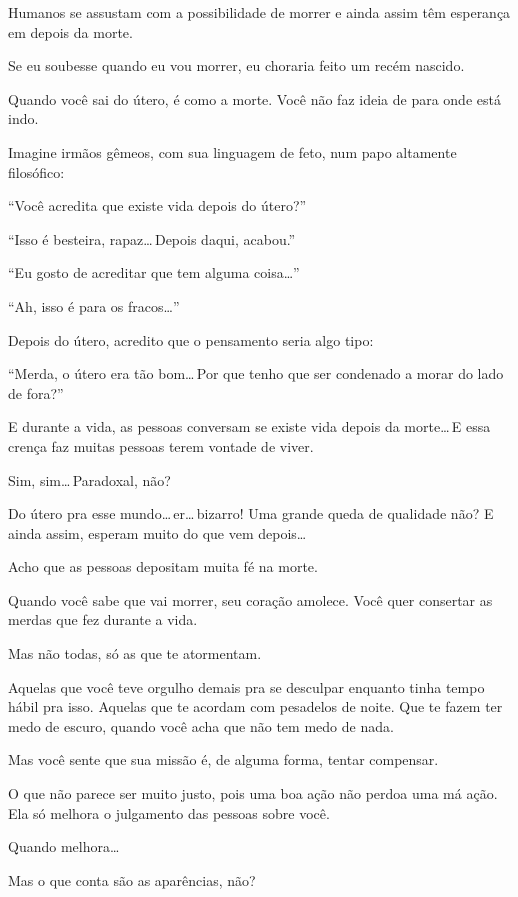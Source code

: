 Humanos se assustam com a possibilidade de morrer e ainda assim têm esperança em depois da morte.

Se eu soubesse quando eu vou morrer, eu choraria feito um recém nascido.

Quando você sai do útero, é como a morte. Você não faz ideia de para onde está indo.

Imagine irmãos gêmeos, com sua linguagem de feto, num papo altamente filosófico:

``Você acredita que existe vida depois do útero?''

``Isso é besteira, rapaz\ldots\,Depois daqui, acabou.''

``Eu gosto de acreditar que tem alguma coisa\ldots''

``Ah, isso é para os fracos\ldots''

Depois do útero, acredito que o pensamento seria algo tipo:

``Merda, o útero era tão bom\ldots\,Por que tenho que ser condenado a morar do lado de fora?''

E durante a vida, as pessoas conversam se existe vida depois da morte\ldots\,E essa crença faz muitas pessoas terem vontade de viver.

Sim, sim\ldots\,Paradoxal, não?

\begin{sloppypar}
Do útero pra esse mundo\ldots\,er\ldots\,bizarro! Uma grande queda de qualidade não? E ainda assim, esperam muito do que vem depois\ldots
\end{sloppypar}

Acho que as pessoas depositam muita fé na morte.

Quando você sabe que vai morrer, seu coração amolece. Você quer consertar as merdas que fez durante a vida.

Mas não todas, só as que te atormentam.

Aquelas que você teve orgulho demais pra se desculpar enquanto tinha tempo hábil pra isso. Aquelas que te acordam com pesadelos de noite. Que te fazem ter medo de escuro, quando você acha que não tem medo de nada.

Mas você sente que sua missão é, de alguma forma, tentar compensar.

O que não parece ser muito justo, pois uma boa ação não perdoa uma má ação. Ela só melhora o julgamento das pessoas sobre você.

Quando melhora\ldots

Mas o que conta são as aparências, não?

